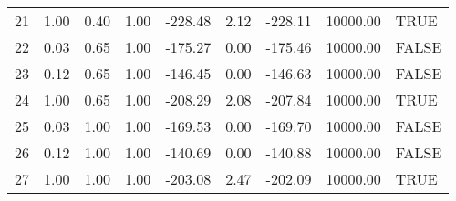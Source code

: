 \begin{table}[ht]
\begin{tabular}{rrrrrrrrl}
  21 & 1.00 & 0.40 & 1.00 & -228.48 & 2.12 & -228.11 & 10000.00 & TRUE \\ 
  22 & 0.03 & 0.65 & 1.00 & -175.27 & 0.00 & -175.46 & 10000.00 & FALSE \\ 
  23 & 0.12 & 0.65 & 1.00 & -146.45 & 0.00 & -146.63 & 10000.00 & FALSE \\ 
  24 & 1.00 & 0.65 & 1.00 & -208.29 & 2.08 & -207.84 & 10000.00 & TRUE \\ 
  25 & 0.03 & 1.00 & 1.00 & -169.53 & 0.00 & -169.70 & 10000.00 & FALSE \\ 
  26 & 0.12 & 1.00 & 1.00 & -140.69 & 0.00 & -140.88 & 10000.00 & FALSE \\ 
  27 & 1.00 & 1.00 & 1.00 & -203.08 & 2.47 & -202.09 & 10000.00 & TRUE \\ 
   \hline
\end{tabular}
\end{table}
